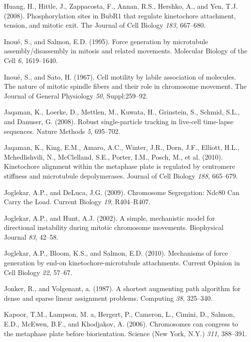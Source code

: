 \documentclass[12pt,a4paper,twoside,openright]{book}
\begin{document}
\hypertarget{ref-Huang2008}{}
Huang, H., Hittle, J., Zappacosta, F., Annan, R.S., Hershko, A., and
Yen, T.J. (2008). Phosphorylation sites in BubR1 that regulate
kinetochore attachment, tension, and mitotic exit. The Journal of Cell
Biology \emph{183}, 667--680.

\hypertarget{ref-Inoue1995}{}
Inoué, S., and Salmon, E.D. (1995). Force generation by microtubule
assembly/disassembly in mitosis and related movements. Molecular Biology
of the Cell \emph{6}, 1619--1640.

\hypertarget{ref-Inoue1967}{}
Inoué, S., and Sato, H. (1967). Cell motility by labile association of
molecules. The nature of mitotic spindle fibers and their role in
chromosome movement. The Journal of General Physiology \emph{50},
Suppl:259--92.

\hypertarget{ref-Jaqaman2008}{}
Jaqaman, K., Loerke, D., Mettlen, M., Kuwata, H., Grinstein, S., Schmid,
S.L., and Danuser, G. (2008). Robust single-particle tracking in
live-cell time-lapse sequences. Nature Methods \emph{5}, 695--702.

\hypertarget{ref-Jaqaman2010}{}
Jaqaman, K., King, E.M., Amaro, A.C., Winter, J.R., Dorn, J.F., Elliott,
H.L., Mchedlishvili, N., McClelland, S.E., Porter, I.M., Posch, M., et
al. (2010). Kinetochore alignment within the metaphase plate is
regulated by centromere stiffness and microtubule depolymerases. Journal
of Cell Biology \emph{188}, 665--679.

\hypertarget{ref-Joglekar2009}{}
Joglekar, A.P., and DeLuca, J.G. (2009). Chromosome Segregation: Ndc80
Can Carry the Load. Current Biology \emph{19}, R404--R407.

\hypertarget{ref-Joglekar2002}{}
Joglekar, A.P., and Hunt, A.J. (2002). A simple, mechanistic model for
directional instability during mitotic chromosome movements. Biophysical
Journal \emph{83}, 42--58.

\hypertarget{ref-Joglekar2010a}{}
Joglekar, A.P., Bloom, K.S., and Salmon, E.D. (2010). Mechanisms of
force generation by end-on kinetochore-microtubule attachments. Current
Opinion in Cell Biology \emph{22}, 57--67.

\hypertarget{ref-Jonker1987}{}
Jonker, R., and Volgenant, a. (1987). A shortest augmenting path
algorithm for dense and sparse linear assignment problems. Computing
\emph{38}, 325--340.

\hypertarget{ref-Kapoor2006}{}
Kapoor, T.M., Lampson, M. a, Hergert, P., Cameron, L., Cimini, D.,
Salmon, E.D., McEwen, B.F., and Khodjakov, A. (2006). Chromosomes can
congress to the metaphase plate before biorientation. Science (New York,
N.Y.) \emph{311}, 388--391.
\end{document}
